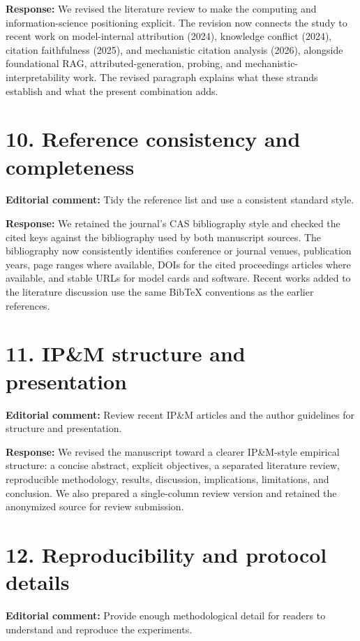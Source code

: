 \documentclass[11pt]{article}
\begin{document}
\textbf{Response:} We revised the literature review to make the computing and information-science positioning explicit. The revision now connects the study to recent work on model-internal attribution (2024), knowledge conflict (2024), citation faithfulness (2025), and mechanistic citation analysis (2026), alongside foundational RAG, attributed-generation, probing, and mechanistic-interpretability work. The revised paragraph explains what these strands establish and what the present combination adds.

\section*{10. Reference consistency and completeness}

\textbf{Editorial comment:} Tidy the reference list and use a consistent standard style.

\textbf{Response:} We retained the journal's CAS bibliography style and checked the cited keys against the bibliography used by both manuscript sources. The bibliography now consistently identifies conference or journal venues, publication years, page ranges where available, DOIs for the cited proceedings articles where available, and stable URLs for model cards and software. Recent works added to the literature discussion use the same BibTeX conventions as the earlier references.

\section*{11. IP\&M structure and presentation}

\textbf{Editorial comment:} Review recent IP\&M articles and the author guidelines for structure and presentation.

\textbf{Response:} We revised the manuscript toward a clearer IP\&M-style empirical structure: a concise abstract, explicit objectives, a separated literature review, reproducible methodology, results, discussion, implications, limitations, and conclusion. We also prepared a single-column review version and retained the anonymized source for review submission.

\section*{12. Reproducibility and protocol details}

\textbf{Editorial comment:} Provide enough methodological detail for readers to understand and reproduce the experiments.
\end{document}
